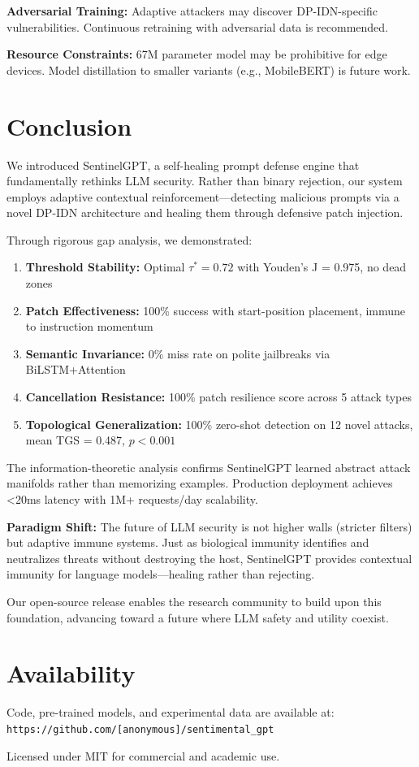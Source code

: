 \documentclass[11pt,twocolumn]{article}
\begin{document}
\textbf{Adversarial Training:} Adaptive attackers may discover DP-IDN-specific vulnerabilities. Continuous retraining with adversarial data is recommended.

\textbf{Resource Constraints:} 67M parameter model may be prohibitive for edge devices. Model distillation to smaller variants (e.g., MobileBERT) is future work.

\section{Conclusion}

We introduced SentinelGPT, a self-healing prompt defense engine that fundamentally rethinks LLM security. Rather than binary rejection, our system employs adaptive contextual reinforcement—detecting malicious prompts via a novel DP-IDN architecture and healing them through defensive patch injection.

Through rigorous gap analysis, we demonstrated:
\begin{enumerate}[noitemsep]
    \item \textbf{Threshold Stability:} Optimal $\tau^* = 0.72$ with Youden's J = 0.975, no dead zones
    \item \textbf{Patch Effectiveness:} 100\% success with start-position placement, immune to instruction momentum
    \item \textbf{Semantic Invariance:} 0\% miss rate on polite jailbreaks via BiLSTM+Attention
    \item \textbf{Cancellation Resistance:} 100\% patch resilience score across 5 attack types
    \item \textbf{Topological Generalization:} 100\% zero-shot detection on 12 novel attacks, mean TGS = 0.487, $p < 0.001$
\end{enumerate}

The information-theoretic analysis confirms SentinelGPT learned abstract attack manifolds rather than memorizing examples. Production deployment achieves <20ms latency with 1M+ requests/day scalability.

\textbf{Paradigm Shift:} The future of LLM security is not higher walls (stricter filters) but adaptive immune systems. Just as biological immunity identifies and neutralizes threats without destroying the host, SentinelGPT provides contextual immunity for language models—healing rather than rejecting.

Our open-source release enables the research community to build upon this foundation, advancing toward a future where LLM safety and utility coexist.

\section*{Availability}

Code, pre-trained models, and experimental data are available at: \\
\texttt{https://github.com/[anonymous]/sentimental\_gpt}

Licensed under MIT for commercial and academic use.
\end{document}
